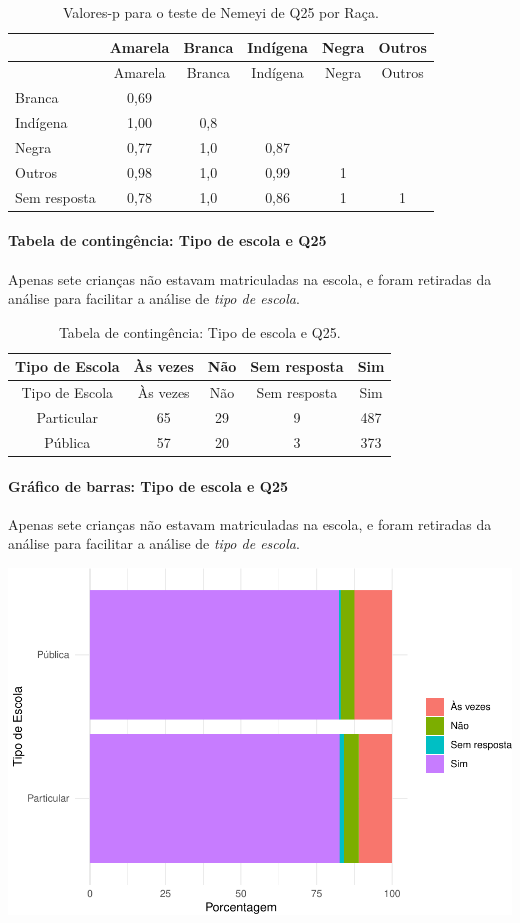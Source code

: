 \documentclass[]{article}
\let\oldparagraph\paragraph
\renewcommand{\paragraph}[1]{\oldparagraph{#1}\mbox{}}
\begin{document}
\begin{longtable}[]{@{}lccccc@{}}
\caption{\label{tab:unnamed-chunk-701}Valores-p para o teste de Nemeyi de Q25 por Raça.}\tabularnewline
\toprule
& Amarela & Branca & Indígena & Negra & Outros\tabularnewline
\midrule
\endfirsthead
\toprule
& Amarela & Branca & Indígena & Negra & Outros\tabularnewline
\midrule
\endhead
Branca & 0,69 & & & &\tabularnewline
Indígena & 1,00 & 0,8 & & &\tabularnewline
Negra & 0,77 & 1,0 & 0,87 & &\tabularnewline
Outros & 0,98 & 1,0 & 0,99 & 1 &\tabularnewline
Sem resposta & 0,78 & 1,0 & 0,86 & 1 & 1\tabularnewline
\bottomrule
\end{longtable}

\cleardoublepage

\hypertarget{tabela-de-continguxeancia-tipo-de-escola-e-q25}{%
\paragraph{Tabela de contingência: Tipo de escola e Q25}\label{tabela-de-continguxeancia-tipo-de-escola-e-q25}}

Apenas sete crianças não estavam matriculadas na escola, e foram retiradas da análise para facilitar a análise de \emph{tipo de escola}.

\begin{longtable}[]{@{}ccccc@{}}
\caption{\label{tab:unnamed-chunk-702}Tabela de contingência: Tipo de escola e Q25.}\tabularnewline
\toprule
Tipo de Escola & Às vezes & Não & Sem resposta & Sim\tabularnewline
\midrule
\endfirsthead
\toprule
Tipo de Escola & Às vezes & Não & Sem resposta & Sim\tabularnewline
\midrule
\endhead
Particular & 65 & 29 & 9 & 487\tabularnewline
Pública & 57 & 20 & 3 & 373\tabularnewline
\bottomrule
\end{longtable}

\hypertarget{gruxe1fico-de-barras-tipo-de-escola-e-q25}{%
\paragraph{Gráfico de barras: Tipo de escola e Q25}\label{gruxe1fico-de-barras-tipo-de-escola-e-q25}}

Apenas sete crianças não estavam matriculadas na escola, e foram retiradas da análise para facilitar a análise de \emph{tipo de escola}.

\begin{center}\includegraphics[width=0.75\linewidth]{relatorio_covid19_files/figure-latex/unnamed-chunk-703-1} \end{center}
\end{document}
